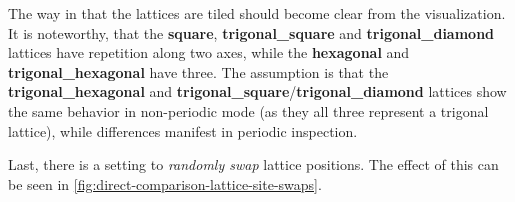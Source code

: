 The way in that the lattices are tiled should become clear from the visualization.
It is noteworthy, that the \textbf{square}, \textbf{trigonal\_square} and \textbf{trigonal\_diamond} lattices have repetition along two axes, while the \textbf{hexagonal} and \textbf{trigonal\_hexagonal} have three. 
The assumption is that the \textbf{trigonal\_hexagonal} and \textbf{trigonal\_square}/\textbf{trigonal\_diamond} lattices show the same behavior in non-periodic mode (as they all three represent a trigonal lattice), while differences manifest in periodic inspection.

Last, there is a setting to \emph{randomly swap} lattice positions. 
The effect of this can be seen in \autoref{fig:direct-comparison-lattice-site-swaps}.

\begin{figure}[htbp]
    \centering


\end{figure}
